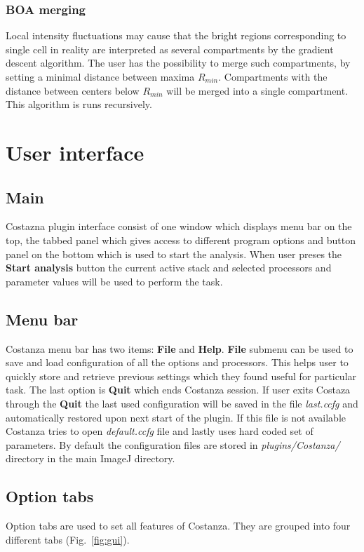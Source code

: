 \documentclass[a4paper,12pt]{article}
\begin{document}
\subsubsection{BOA merging}
Local intensity fluctuations may cause that the bright regions corresponding to single cell in reality
are interpreted as several
compartments by the gradient descent algorithm. The user has the possibility
to merge such compartments, by setting a minimal distance between maxima
$R_{min}$. Compartments with the distance between centers below $R_{min}$ will be
merged into a single compartment. This algorithm is runs recursively.

\section{User interface}

\subsection{Main}
Costazna plugin interface consist of one window which displays menu bar on the top, the tabbed panel which gives access to different program options and button panel on the bottom which is used to start the analysis. When user preses the \textbf{Start analysis} button the current active stack and selected processors and parameter values will be used to perform the task.
 
\subsection{Menu bar}
Costanza menu bar has two items: \textbf{File} and \textbf{Help}. \textbf{File} submenu can be used to save and load configuration of all the options and processors. This helps user to quickly store and retrieve previous settings which they found useful for particular task. The last option is \textbf{Quit} which ends Costanza session. If user exits Costaza through the \textbf{Quit} the last used configuration will be saved in the file \textit{last.ccfg} and automatically restored upon next start of the plugin. If this file is not available Costanza tries to open \textit{default.ccfg} file and lastly uses hard coded set of parameters. By default the configuration files are stored in \textit{plugins/Costanza/} directory in the main ImageJ directory.
 
\subsection{Option tabs}
Option tabs are used to set all features of Costanza. They are grouped into four different tabs (Fig.~\ref{fig:gui}). 
\end{document}
